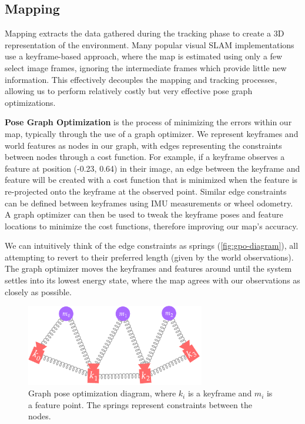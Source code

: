 \subsection{Mapping}
\label{sec:visual-slam-mapping}
Mapping extracts the data gathered during the tracking phase to create a 3D representation of the environment. Many popular visual SLAM implementations use a keyframe-based approach, where the map is estimated using only a few select image frames, ignoring the intermediate frames which provide little new information. This effectively decouples the mapping and tracking processes, allowing us to perform relatively costly but very effective pose graph optimizations.

\textbf{Pose Graph Optimization} is the process of minimizing the errors within our map, typically through the use of a graph optimizer. We represent keyframes and world features as nodes in our graph, with edges representing the constraints between nodes through a cost function. For example, if a keyframe observes a feature at position (-0.23, 0.64) in their image, an edge between the keyframe and feature will be created with a cost function that is minimized when the feature is re-projected onto the keyframe at the observed point. Similar edge constraints can be defined between keyframes using IMU measurements or wheel odometry. A graph optimizer can then be used to tweak the keyframe poses and feature locations to minimize the cost functions, therefore improving our map's accuracy.

We can intuitively think of the edge constraints as springs (\autoref{fig:gpo-diagram}), all attempting to revert to their preferred length (given by the world observations). The graph optimizer moves the keyframes and features around until the system settles into its lowest energy state, where the map agrees with our observations as closely as possible.

\begin{figure}[h]
    \centering
    \begin{minipage}[t]{0.6\textwidth}
        \centering
        \includegraphics[height=1.4in]{figures/gpo_diagram.pdf}
        \caption{Graph pose optimization diagram, where $k_i$ is a keyframe and $m_i$ is a feature point. The springs represent constraints between the nodes.}
        \label{fig:gpo-diagram}
    \end{minipage}%
\end{figure}

